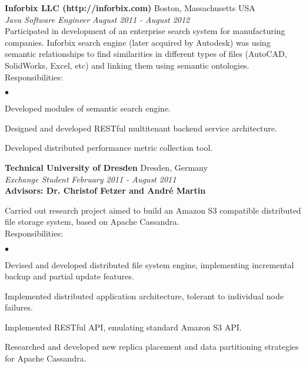 \documentclass[margin,line]{res}
\newenvironment{list2}{
  \begin{list}{$\bullet$}{%
      \setlength{\itemsep}{0in}
      \setlength{\parsep}{0in} \setlength{\parskip}{0in}
      \setlength{\topsep}{0in} \setlength{\partopsep}{0in} 
      \setlength{\leftmargin}{0.2in}}}{\end{list}}
\begin{document}
\begin{resume}
{\bf Inforbix LLC (http://inforbix.com)} \hfill { Boston, Massachusetts USA }\\
{\em Java Software Engineer} \hfill {\it August 2011 - August 2012}\\
Participated in development of an enterprise search system for manufacturing companies. Inforbix search engine (later acquired by Autodesk) was using semantic relationships to find similarities in different types of files (AutoCAD, SolidWorks, Excel, etc) and linking them using semantic ontologies.\\
Responsibilities:
\begin{list2}
	\item Developed modules of semantic search engine.
	\item Designed and developed RESTful multitenant backend service architecture.
	\item Developed distributed performance metric collection tool.
\end{list2}

{\bf Technical University of Dresden } \hfill { Dresden, Germany} \\
{\em Exchange Student} \hfill {\it February 2011 - August 2011}\\
{\bf Advisors: Dr. Christof Fetzer and Andr\'e Martin} 

\vspace{-.3cm}
Carried out research project aimed to build an Amazon S3 compatible distributed file storage system, based on Apache Cassandra.\\
Responsibilities:
\begin{list2}
	\item Devised and developed distributed file system engine, implementing incremental backup and partial update features.%
	\item Implemented distributed application architecture, tolerant to individual node failures.
	\item Implemented RESTful API, emulating standard Amazon S3 API.
	\item Researched and developed new replica placement and data partitioning strategies for Apache Cassandra.
\end{list2}




\end{resume}
\end{document}
